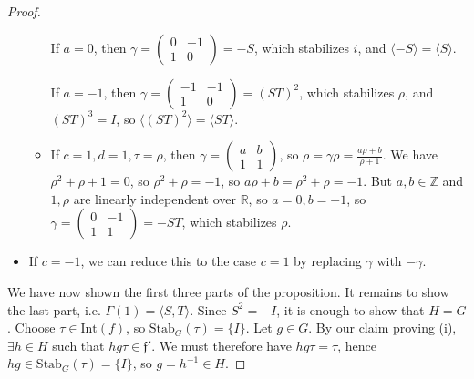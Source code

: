 \documentclass{article}
\theoremstyle{definition}
\begin{document}
\begin{proof}
\begin{itemize}
\begin{itemize}
            If $a=0$, then $\gamma = \begin{pmatrix} 0  & -1 \\ 1 & 0 \end{pmatrix} = -S$, which stabilizes $i$, and $\langle -S \rangle = \langle S \rangle$.
            \vspace{1mm}
             
            If $a=-1$, then $\gamma = \begin{pmatrix} -1 & -1 \\ 1 & 0 \end{pmatrix} = (ST)^2$, which stabilizes $\rho$, and $(ST)^3 = I$, so $\langle (ST)^2 \rangle = \langle ST \rangle$.
            \item If $c=1, d=1, \tau = \rho$, then $\gamma = \begin{pmatrix} a & b \\1 & 1 \end{pmatrix}$, so $\rho = \gamma \rho = \frac{a \rho + b}{\rho + 1}$. We have $\rho^2 + \rho + 1 = 0$, so $\rho^2 + \rho = -1$, so $a \rho + b = \rho^2 + \rho = -1$. But $a, b \in \mathbb{Z}$ and $1,\rho$ are linearly independent over $\mathbb{R}$, so $a = 0, b = -1$, so $\gamma = \begin{pmatrix} 0 & -1 \\ 1 & 1 \end{pmatrix} = -ST$, which stabilizes $\rho$.
        \end{itemize}
        \item If $c = -1$, we can reduce this to the case $c=1$ by replacing $\gamma$ with $-\gamma$.
    \end{itemize}
    We have now shown the first three parts of the proposition. It remains to show the last part, i.e. $\Gamma(1) = \langle S,T \rangle$. Since $S^2 = -I$, it is enough to show that $H = G$. Choose $\tau \in \text{Int}(f)$, so $\text{Stab}_G(\tau) = \{I\}$. Let $g \in G$. By our claim proving (i), $\exists h \in H$ such that $hg \tau  \in \mathfrak{f}'$. We must therefore have $hg \tau = \tau$, hence $h g  \in \text{Stab}_G(\tau) = \{I\}$, so $g = h^{-1} \in H$.
\end{proof}
\end{document}
